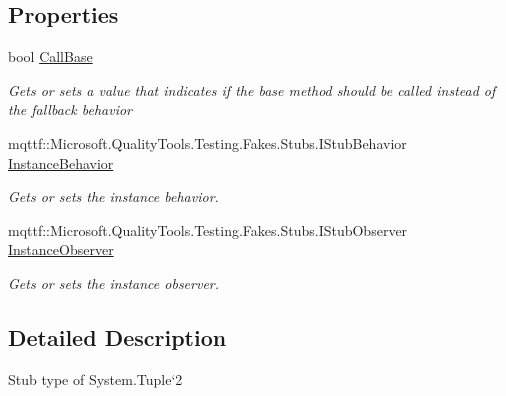\subsection*{Properties}
\begin{DoxyCompactItemize}
\item 
bool \hyperlink{class_system_1_1_fakes_1_1_stub_tuple_3_01_t1_00_01_t2_01_4_acc6afdff191cae91d04e8813c8882e9a}{Call\-Base}
\begin{DoxyCompactList}\small\item\em Gets or sets a value that indicates if the base method should be called instead of the fallback behavior\end{DoxyCompactList}\item 
mqttf\-::\-Microsoft.\-Quality\-Tools.\-Testing.\-Fakes.\-Stubs.\-I\-Stub\-Behavior \hyperlink{class_system_1_1_fakes_1_1_stub_tuple_3_01_t1_00_01_t2_01_4_afce2727f8aacbc9484348757f524cfa9}{Instance\-Behavior}
\begin{DoxyCompactList}\small\item\em Gets or sets the instance behavior.\end{DoxyCompactList}\item 
mqttf\-::\-Microsoft.\-Quality\-Tools.\-Testing.\-Fakes.\-Stubs.\-I\-Stub\-Observer \hyperlink{class_system_1_1_fakes_1_1_stub_tuple_3_01_t1_00_01_t2_01_4_a7a72f1b8d86763c048b63fd800dbe2c5}{Instance\-Observer}
\begin{DoxyCompactList}\small\item\em Gets or sets the instance observer.\end{DoxyCompactList}\end{DoxyCompactItemize}


\subsection{Detailed Description}
Stub type of System.\-Tuple`2



